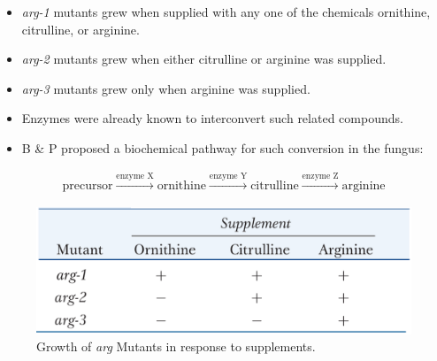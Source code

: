 \documentclass[11pt,dvipsnames,ignorenonframetext,aspectratio=169]{beamer}
\providecommand{\tightlist}{%
  \setlength{\itemsep}{0pt}\setlength{\parskip}{0pt}}
\begin{document}
\begin{frame}{}
\protect\hypertarget{section-9}{}
\begin{itemize}
\tightlist
\item
  \emph{arg-1} mutants grew when supplied with any one of the chemicals
  ornithine, citrulline, or arginine.
\item
  \emph{arg-2} mutants grew when either citrulline or arginine was
  supplied.
\item
  \emph{arg-3} mutants grew only when arginine was supplied.
\item
  Enzymes were already known to interconvert such related compounds.
\item
  B \& P proposed a biochemical pathway for such conversion in the
  fungus:
\end{itemize}

\[
\begin{aligned}
\textrm{precursor} \xrightarrow{\text{enzyme X}} \textrm{ornithine} \xrightarrow{\text{enzyme Y}} \textrm{citrulline} \xrightarrow{\text{enzyme Z}} \textrm{arginine}
\end{aligned}
\]

\begin{figure}
\includegraphics[width=0.4\linewidth]{./../images/mutant_growth_supplements} \caption{Growth of \textit{arg} Mutants in response to supplements.}\label{fig:mutants-supplements}
\end{figure}
\end{frame}
\end{document}
